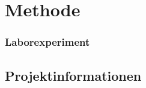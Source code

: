 \chapter{Methode}\label{ch:Methode}


\subsection{Laborexperiment}


\section{Projektinformationen}

